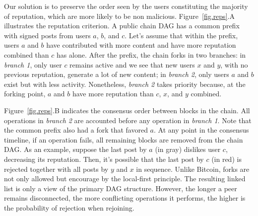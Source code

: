 \documentclass[10pt,journal,compsoc]{IEEEtran}
\newcommand{\reps}     {\emph{reps}\xspace}
\begin{document}
Our solution is to preserve the order seen by the users constituting the
majority of reputation, which are more likely to be non malicious.
%
Figure~\ref{fig.reps}.A illustrates the reputation criterion.
A public chain DAG has a common prefix with signed posts from users $a$, $b$,
and $c$.
Let's assume that within the prefix, users $a$ and $b$ have contributed with
more content and have more reputation combined than $c$ has alone.
%
After the prefix, the chain forks in two branches:
in \emph{branch 1}, only user $c$ remains active and we see that new users $x$
and $y$, with no previous reputation, generate a lot of new content;
in \emph{branch 2}, only users $a$ and $b$ exist but with less activity.
Nonetheless, \emph{branch 2} takes priority because, at the forking point, $a$
and $b$ have more reputation than $c$, $x$, and $y$ combined.

Figure~\ref{fig.reps}.B indicates the consensus order between blocks in the
chain.
All operations in \emph{branch 2} are accounted before any operation in
\emph{branch 1}.
Note that the common prefix also had a fork that favored $a$.
%
At any point in the consensus timeline, if an operation fails, all remaining
blocks are removed from the chain DAG.
As an example, suppose the last post by $a$ (in gray) dislikes user $c$,
decreasing its reputation.
Then, it's possible that the last post by $c$ (in red) is rejected together
with all posts by $y$ and $x$ in sequence.
%
Unlike Bitcoin, forks are not only allowed but encourage by the local-first
principle.
The resulting linked list is only a view of the primary DAG structure.
However, the longer a peer remains disconnected, the more conflicting
operations it performs, the higher is the probability of rejection when
rejoining.
\end{document}
